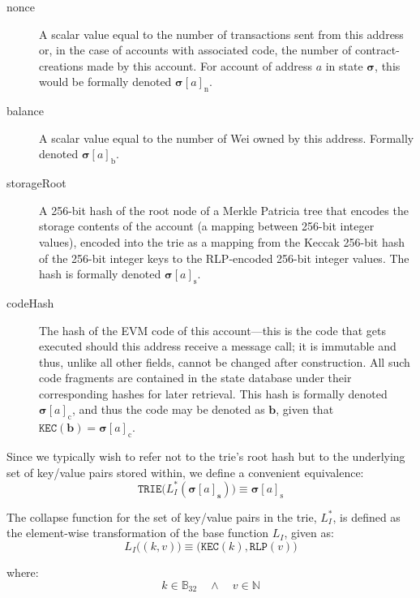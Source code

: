 \documentclass[9pt,oneside]{amsart}
\makeatletter
\newcommand{\linkdest}[1]{\Hy@raisedlink{\hypertarget{#1}{}}}
\makeatother
\begin{document}
\begin{multicols}{2}
\begin{description}
\item[nonce] \linkdest{account_nonce}A scalar value equal to the number of transactions sent from this address or, in the case of accounts with associated code, the number of contract-creations made by this account. For account of address $a$ in state $\boldsymbol{\sigma}$, this would be formally denoted $\boldsymbol{\sigma}[a]_{\mathrm{n}}$.
\item[balance] A scalar value equal to the number of Wei owned by this address. Formally denoted $\boldsymbol{\sigma}[a]_{\mathrm{b}}$.
\item[storageRoot] A 256-bit hash of the root node of a Merkle Patricia tree that encodes the storage contents of the account (a mapping between 256-bit integer values), encoded into the trie as a mapping from the Keccak 256-bit hash of the  256-bit integer keys to the RLP-encoded 256-bit integer values. The hash is formally denoted $\boldsymbol{\sigma}[a]_{\mathrm{s}}$.
\item[codeHash] The hash of the EVM code of this account---this is the code that gets executed should this address receive a message call; it is immutable and thus, unlike all other fields, cannot be changed after construction. All such code fragments are contained in the state database under their corresponding hashes for later retrieval. This hash is formally denoted $\boldsymbol{\sigma}[a]_{\mathrm{c}}$, and thus the code may be denoted as $\mathbf{b}$, given that $\texttt{KEC}(\mathbf{b}) = \boldsymbol{\sigma}[a]_{\mathrm{c}}$.
\end{description}

Since we typically wish to refer not to the trie's root hash but to the underlying set of key/value pairs stored within, we define a convenient equivalence:
\begin{equation}
\texttt{TRIE}\big(L_{I}^*(\boldsymbol{\sigma}[a]_{\mathbf{s}})\big) \equiv \boldsymbol{\sigma}[a]_{\mathrm{s}}
\end{equation}

The collapse function for the set of key/value pairs in the trie, $L_{I}^*$, is defined as the element-wise transformation of the base function $L_{I}$, given as:
\begin{equation}
L_{I}\big( (k, v) \big) \equiv \big(\texttt{KEC}(k), \texttt{RLP}(v)\big)
\end{equation}

where:
\begin{equation}
k \in \mathbb{B}_{32} \quad \wedge \quad v \in \mathbb{N}
\end{equation}


\end{multicols}
\end{document}
